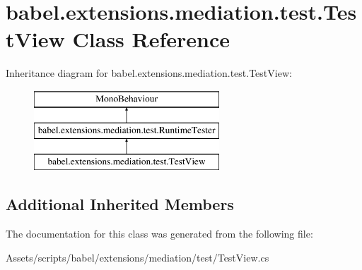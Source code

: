 \hypertarget{classbabel_1_1extensions_1_1mediation_1_1test_1_1_test_view}{\section{babel.\-extensions.\-mediation.\-test.\-Test\-View Class Reference}
\label{classbabel_1_1extensions_1_1mediation_1_1test_1_1_test_view}
}
Inheritance diagram for babel.\-extensions.\-mediation.\-test.\-Test\-View\-:\begin{figure}[H]
\begin{center}
\leavevmode
\includegraphics[height=3.000000cm]{classbabel_1_1extensions_1_1mediation_1_1test_1_1_test_view}
\end{center}
\end{figure}
\subsection*{Additional Inherited Members}


The documentation for this class was generated from the following file\-:\begin{DoxyCompactItemize}
\item 
Assets/scripts/babel/extensions/mediation/test/Test\-View.\-cs\end{DoxyCompactItemize}
